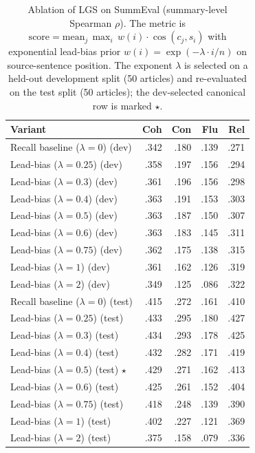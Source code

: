\begin{table}[t]
\centering
\caption{Ablation of LGS on SummEval (summary-level Spearman $\rho$). The metric is $\mathrm{score} = \mathrm{mean}_j\, \max_i\, w(i)\cdot\cos(c_j, s_i)$ with exponential lead-bias prior $w(i)=\exp(-\lambda \cdot i / n)$ on source-sentence position. The exponent $\lambda$ is selected on a held-out development split (50 articles) and re-evaluated on the test split (50 articles); the dev-selected canonical row is marked $\star$.}
\label{tab:ablation_lgs}
\begin{tabular}{lrrrr}
\toprule
Variant & Coh & Con & Flu & Rel \\
\midrule
Recall baseline ($\lambda=0$) (dev) & .342 & .180 & .139 & .271 \\
Lead-bias ($\lambda=0.25$) (dev) & .358 & .197 & .156 & .294 \\
Lead-bias ($\lambda=0.3$) (dev) & .361 & .196 & .156 & .298 \\
Lead-bias ($\lambda=0.4$) (dev) & .363 & .191 & .153 & .303 \\
Lead-bias ($\lambda=0.5$) (dev) & .363 & .187 & .150 & .307 \\
Lead-bias ($\lambda=0.6$) (dev) & .363 & .183 & .145 & .311 \\
Lead-bias ($\lambda=0.75$) (dev) & .362 & .175 & .138 & .315 \\
Lead-bias ($\lambda=1$) (dev) & .361 & .162 & .126 & .319 \\
Lead-bias ($\lambda=2$) (dev) & .349 & .125 & .086 & .322 \\
\midrule
Recall baseline ($\lambda=0$) (test) & .415 & .272 & .161 & .410 \\
Lead-bias ($\lambda=0.25$) (test) & .433 & .295 & .180 & .427 \\
Lead-bias ($\lambda=0.3$) (test) & .434 & .293 & .178 & .425 \\
Lead-bias ($\lambda=0.4$) (test) & .432 & .282 & .171 & .419 \\
Lead-bias ($\lambda=0.5$) (test) $\star$ & .429 & .271 & .162 & .413 \\
Lead-bias ($\lambda=0.6$) (test) & .425 & .261 & .152 & .404 \\
Lead-bias ($\lambda=0.75$) (test) & .418 & .248 & .139 & .390 \\
Lead-bias ($\lambda=1$) (test) & .402 & .227 & .121 & .369 \\
Lead-bias ($\lambda=2$) (test) & .375 & .158 & .079 & .336 \\
\bottomrule
\end{tabular}
\end{table}

